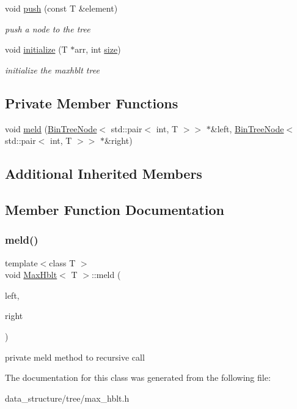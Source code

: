 \begin{DoxyCompactItemize}
\mbox{\label{classMaxHblt_adfe07cefe42e2a7feddf061a1e601396}} 
void \hyperlink{classMaxHblt_adfe07cefe42e2a7feddf061a1e601396}{push} (const T \&element)
\begin{DoxyCompactList}\small\item\em push a node to the tree \end{DoxyCompactList}\item 
\mbox{\label{classMaxHblt_a3f8bd08381873a4fc70e8549130e54e6}} 
void \hyperlink{classMaxHblt_a3f8bd08381873a4fc70e8549130e54e6}{initialize} (T $\ast$arr, int \hyperlink{classMaxHblt_ae8a4af940e3e9f8f346c63f0407a72cd}{size})
\begin{DoxyCompactList}\small\item\em initialize the maxhblt tree \end{DoxyCompactList}\end{DoxyCompactItemize}
\subsection*{Private Member Functions}
\begin{DoxyCompactItemize}
\item 
void \hyperlink{classMaxHblt_ac60f9c62ad392a8df8bcbd3b91129d37}{meld} (\hyperlink{structBinTreeNode}{Bin\+Tree\+Node}$<$ std\+::pair$<$ int, T $>$$>$ $\ast$\&left, \hyperlink{structBinTreeNode}{Bin\+Tree\+Node}$<$ std\+::pair$<$ int, T $>$$>$ $\ast$\&right)
\end{DoxyCompactItemize}
\subsection*{Additional Inherited Members}


\subsection{Member Function Documentation}
\mbox{\label{classMaxHblt_ac60f9c62ad392a8df8bcbd3b91129d37}} 
\subsubsection{\texorpdfstring{meld()}{meld()}}
{\footnotesize\ttfamily template$<$class T $>$ \\
void \hyperlink{classMaxHblt}{Max\+Hblt}$<$ T $>$\+::meld (\begin{DoxyParamCaption}\item[{\hyperlink{structBinTreeNode}{Bin\+Tree\+Node}$<$ std\+::pair$<$ int, T $>$$>$ $\ast$\&}]{left,  }\item[{\hyperlink{structBinTreeNode}{Bin\+Tree\+Node}$<$ std\+::pair$<$ int, T $>$$>$ $\ast$\&}]{right }\end{DoxyParamCaption})\hspace{0.3cm}{\ttfamily [private]}}

private meld method to recursive call 

The documentation for this class was generated from the following file\+:\begin{DoxyCompactItemize}
\item 
data\+\_\+structure/tree/max\+\_\+hblt.\+h\end{DoxyCompactItemize}
